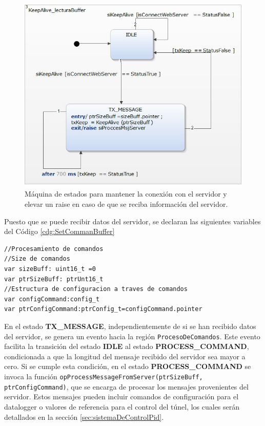 \begin{figure}[H]
    \centering
    \includegraphics[width=0.6\linewidth]{Figuras/datalogger/Firmware/keepAlive.jpg}
    \caption{Máquina de estados para mantener la conexión con el servidor y elevar un raise en caso de que se reciba información del servidor.}
    \label{fig:keepAlive}
\end{figure}

Puesto que se puede recibir datos del servidor, se declaran las siguientes variables del Código \ref{cdg:SetCommanBuffer}

\begin{lstlisting}[style=yakindustyle, caption={Declaración de variables para validar y procesar la recepción de datos del servidor.}, label=cdg:SetCommanBuffer]
//Procesamiento de comandos
//Size de comandos
var sizeBuff: uint16_t =0
var ptrSizeBuff: ptrUnt16_t
//Estructura de configuracion a traves de comandos
var configCommand:config_t
var ptrConfigCommand:ptrConfig_t=configCommand.pointer
\end{lstlisting}

En el estado \textbf{TX\_MESSAGE}, independientemente de si se han recibido datos del servidor, se genera un evento hacia la región \texttt{ProcesoDeComandos}. Este evento facilita la transición del estado \textbf{IDLE} al estado \textbf{PROCESS\_COMMAND}, condicionada a que la longitud del mensaje recibido del servidor sea mayor a cero. Si se cumple esta condición, en el estado \textbf{PROCESS\_COMMAND} se invoca la función \texttt{opProcessMessageFromServer(ptrSizeBuff, ptrConfigCommand)}, que se encarga de procesar los mensajes provenientes del servidor. Estos mensajes pueden incluir comandos de configuración para el datalogger o valores de referencia para el control del túnel, los cuales serán detallados en la sección \ref{sec:sistemaDeControlPid}.

